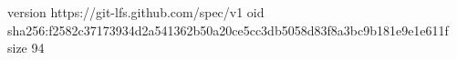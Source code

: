 version https://git-lfs.github.com/spec/v1
oid sha256:f2582c37173934d2a541362b50a20ce5cc3db5058d83f8a3bc9b181e9e1e611f
size 94
